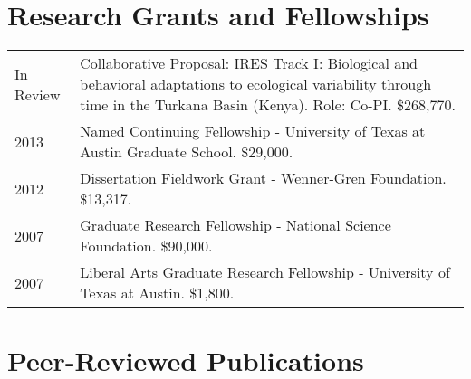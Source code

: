 \documentclass{article}
\begin{document}
\section*{Research Grants and Fellowships}
\begin{tabular}{p{}p{}}
In Review & Collaborative Proposal: IRES Track I: Biological and behavioral adaptations to ecological variability through time in the Turkana Basin (Kenya). Role: Co-PI. \$268,770.\\[4pt]
2013 & Named Continuing Fellowship - University of Texas at Austin Graduate School. \$29,000.\\[4pt]
2012  & Dissertation Fieldwork Grant - Wenner-Gren Foundation. \$13,317.\\[4pt]
2007 &  Graduate Research Fellowship - National Science Foundation. \$90,000.\\[4pt]
2007 &  Liberal Arts Graduate Research Fellowship - University of Texas at Austin. \$1,800.\\[4pt]

\end{tabular}



\section*{Peer-Reviewed Publications}
\end{document}
